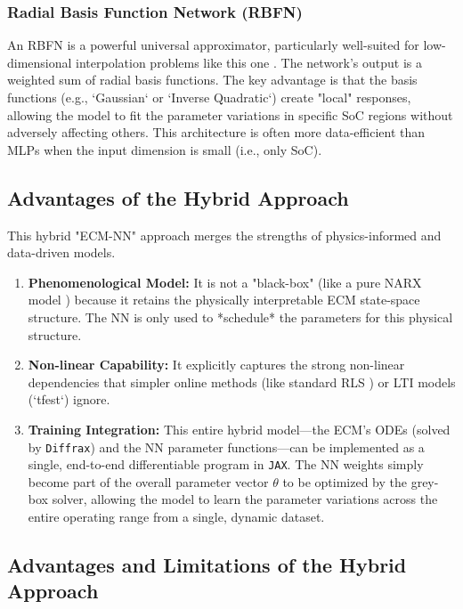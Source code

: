 \documentclass[]{article}
\begin{document}
\subsubsection{Radial Basis Function Network (RBFN)}
An RBFN is a powerful universal approximator, particularly well-suited for low-dimensional interpolation problems like this one \cite{broomhead1988radial}. The network's output is a weighted sum of radial basis functions. The key advantage is that the basis functions (e.g., `Gaussian` or `Inverse Quadratic`) create "local" responses, allowing the model to fit the parameter variations in specific SoC regions without adversely affecting others. This architecture is often more data-efficient than MLPs when the input dimension is small (i.e., only SoC).

\subsection{Advantages of the Hybrid Approach}

This hybrid "ECM-NN" approach merges the strengths of physics-informed and data-driven models.
\begin{enumerate}
	\item \textbf{Phenomenological Model:} It is not a "black-box" (like a pure NARX model \cite{takyi2023narx, xia2024hybrid}) because it retains the physically interpretable ECM state-space structure. The NN is only used to *schedule* the parameters for this physical structure.
	\item \textbf{Non-linear Capability:} It explicitly captures the strong non-linear dependencies \cite{tran2021comprehensive} that simpler online methods (like standard RLS \cite{pai2023online}) or LTI models (`tfest`) ignore.
	\item \textbf{Training Integration:} This entire hybrid model—the ECM's ODEs (solved by \texttt{Diffrax}) and the NN parameter functions—can be implemented as a single, end-to-end differentiable program in \texttt{JAX}. The NN weights simply become part of the overall parameter vector $\theta$ to be optimized by the grey-box solver, allowing the model to learn the parameter variations across the entire operating range from a single, dynamic dataset.
\end{enumerate}

\subsection{Advantages and Limitations of the Hybrid Approach}
\end{document}
